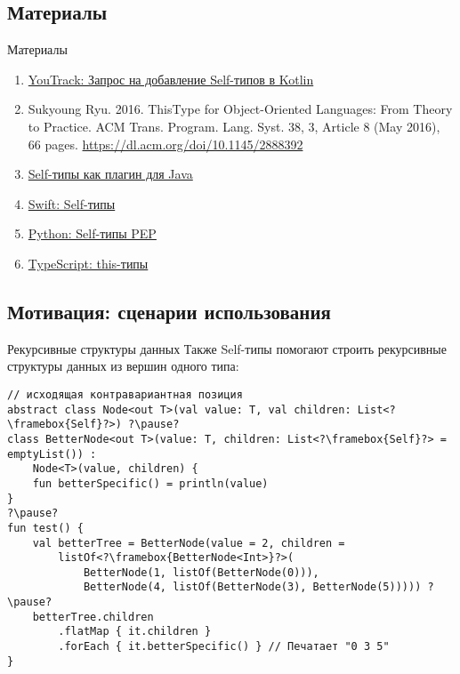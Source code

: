 \documentclass[handout,aspectratio=169,usenames,dvipsnames]{beamer}
\begin{document}
    \subsection{Материалы}

    \begin{frame}{Материалы}
        \begin{enumerate}
            \item \href{https://youtrack.jetbrains.com/issue/KT-6494}{\color{blue} YouTrack: Запрос на добавление Self-типов в Kotlin}
            \item Sukyoung Ryu. 2016. ThisType for Object-Oriented Languages: From Theory to Practice. ACM Trans. Program. Lang. Syst. 38, 3, Article 8 (May 2016), 66 pages. {\color{blue}\url{https://dl.acm.org/doi/10.1145/2888392}}
            \item \href{https://github.com/manifold-systems/manifold/blob/master/manifold-deps-parent/manifold-ext/README.md#the-self-type-with-self}{\color{blue} Self-типы как плагин для Java}
            \item \href{https://docs.swift.org/swift-book/documentation/the-swift-programming-language/types/\#Self-Type}{\color{blue} Swift: Self-типы}
            \item \href{https://peps.python.org/pep-0673/}{\color{blue} Python: Self-типы PEP}
            \item \href{https://www.typescriptlang.org/docs/handbook/2/classes.html\#this-types}{\color{blue}TypeScript: this-типы}
        \end{enumerate}
    \end{frame}

    \subsection{Мотивация: сценарии использования}

    \begin{frame}[fragile]{Рекурсивные структуры данных}
        Также Self-типы помогают строить рекурсивные структуры данных из вершин одного типа:
        \begin{verbatim}
// исходящая контравариантная позиция
abstract class Node<out T>(val value: T, val children: List<?\framebox{Self}?>) ?\pause?
class BetterNode<out T>(value: T, children: List<?\framebox{Self}?> = emptyList()) :
    Node<T>(value, children) {
    fun betterSpecific() = println(value)
}
?\pause?
fun test() {
    val betterTree = BetterNode(value = 2, children =
        listOf<?\framebox{BetterNode<Int>}?>(
            BetterNode(1, listOf(BetterNode(0))),
            BetterNode(4, listOf(BetterNode(3), BetterNode(5))))) ?\pause?
    betterTree.children
        .flatMap { it.children }
        .forEach { it.betterSpecific() } // Печатает "0 3 5"
}
        \end{verbatim}
    \end{frame}
\end{document}
